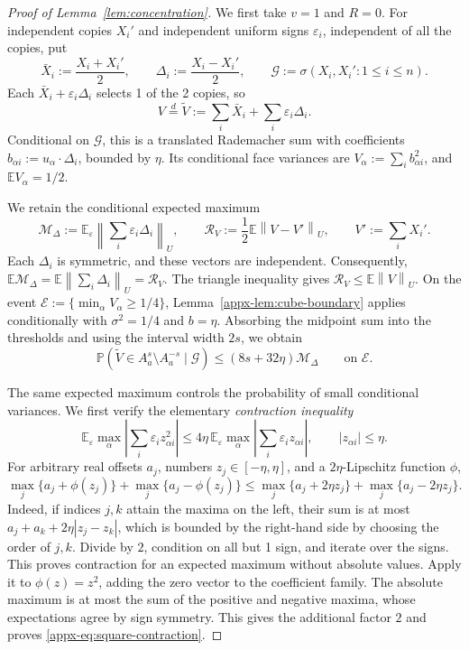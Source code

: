 \documentclass[11pt,letterpaper]{article}
\theoremstyle{remark}
\newcommand{\E}{\mathbb E}
\newcommand{\Pp}{\mathbb P}
\newcommand{\norm}[1]{\left\lVert#1\right\rVert}
\begin{document}
\begin{proof}[Proof of Lemma~\ref{lem:concentration}]
We first take \(v=1\) and \(R=0\). For independent copies \(X_i'\)
and independent uniform signs \(\varepsilon_i\), independent of
all the copies, put
\[
 \bar X_i:=\frac{X_i+X_i'}2,\qquad
 \Delta_i:=\frac{X_i-X_i'}2,\qquad
 \mathcal G:=\sigma(X_i,X_i':1\le i\le n).
\]
Each \(\bar X_i+\varepsilon_i\Delta_i\) selects 1 of the 2 copies, so
\begin{equation}
 V\stackrel d=\widetilde V:=\sum_i\bar X_i+\sum_i\varepsilon_i\Delta_i.
 \label{appx-eq:pair-representation}
\end{equation}
Conditional on \(\mathcal G\), this is a translated Rademacher sum
with coefficients \(b_{\alpha i}:=u_\alpha\cdot\Delta_i\), bounded
by \(\eta\). Its conditional face variances are
\(V_\alpha:=\sum_i b_{\alpha i}^2\), and
\(\E V_\alpha=1/2\).

We retain the conditional expected maximum
\[
 \mathcal M_\Delta:=\E_\varepsilon
       \norm{\sum_i\varepsilon_i\Delta_i}_U,
 \qquad
 \mathcal R_V:=\frac12\E\norm{V-V'}_U,
 \qquad V':=\sum_iX_i'.
\]
Each \(\Delta_i\) is symmetric, and these vectors are independent.
Consequently,
\(\E\mathcal M_\Delta=\E\norm{\sum_i\Delta_i}_U=\mathcal R_V\).
The triangle inequality gives \(\mathcal R_V\le\E\norm{V}_U\).
On the event
\(\mathcal E:=\{\min_\alpha V_\alpha\ge1/4\}\),
Lemma~\ref{appx-lem:cube-boundary} applies conditionally with
\(\sigma^2=1/4\) and \(b=\eta\). Absorbing the midpoint sum into
the thresholds and using the interval width \(2s\), we obtain
\begin{equation}
 \Pp(\widetilde V\in A_a^s\setminus A_a^{-s}\mid\mathcal G)
 \le(8s+32\eta)\mathcal M_\Delta
 \qquad\text{on }\mathcal E.
 \label{appx-eq:conditional-intrinsic-concentration}
\end{equation}

The same expected maximum controls the probability of small
conditional variances. We first verify the elementary
\emph{contraction inequality}
\begin{equation}
 \E_\varepsilon\max_\alpha
       \left|\sum_i\varepsilon_i z_{\alpha i}^2\right|
 \le4\eta\,\E_\varepsilon\max_\alpha
       \left|\sum_i\varepsilon_i z_{\alpha i}\right|,
 \qquad |z_{\alpha i}|\le\eta.
 \label{appx-eq:square-contraction}
\end{equation}
For arbitrary real offsets \(a_j\), numbers \(z_j\in[-\eta,\eta]\),
and a \(2\eta\)-Lipschitz function \(\phi\),
\[
 \max_j\{a_j+\phi(z_j)\}+\max_j\{a_j-\phi(z_j)\}
 \le\max_j\{a_j+2\eta z_j\}+\max_j\{a_j-2\eta z_j\}.
\]
Indeed, if indices \(j,k\) attain the maxima on the left, their
sum is at most \(a_j+a_k+2\eta|z_j-z_k|\), which is bounded by
the right-hand side by choosing the order of \(j,k\).
Divide by \(2\), condition on all but 1 sign, and iterate over
the signs. This proves contraction for an expected maximum without
absolute values. Apply it to \(\phi(z)=z^2\), adding the zero vector
to the coefficient family. The absolute maximum is at most the sum
of the positive and negative maxima, whose expectations agree by
sign symmetry. This gives the additional factor \(2\) and proves
\eqref{appx-eq:square-contraction}.


\end{proof}
\end{document}
